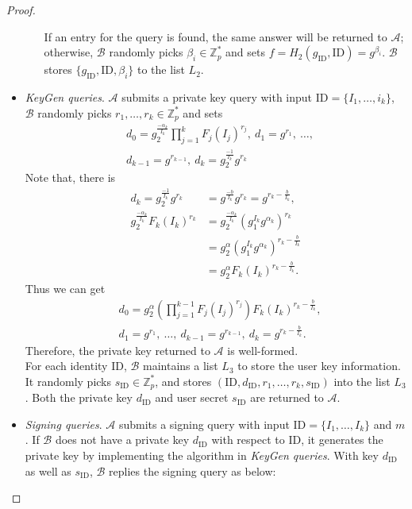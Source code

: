 \documentclass[times]{secauth}
\theoremstyle{definition}
\theoremstyle{remark}
\begin{document}
\begin{proof}
\begin{itemize}
\begin{itemize}
		If an entry for the query is found, the same answer will be returned to $\mathcal{A}$; otherwise, $\mathcal{B}$ randomly picks $\beta_i \in \mathbb{Z}_p^*$ and sets $f = H_2(g_\mathrm{ID}, \mathrm{ID}) = g^{\beta_i}$. 
		$\mathcal{B}$ stores $\{g_\mathrm{ID}, \mathrm{ID}, \beta_i\}$ to the list $L_2$. 	
	\end{itemize}
	\item \emph{KeyGen queries}. 
	$\mathcal{A}$ submits a private key query with input $\mathrm{ID} = \{I_1, \ldots, i_k\}$, $\mathcal{B}$ randomly picks $r_1, \ldots, r_k \in \mathbb{Z}_p^*$ and sets
	\begin{align*}
	&d_0 = g_2^{\frac{-\alpha_k}{I_k}}\prod_{j=1}^{k}F_j(I_j)^{r_j}, ~d_1=g^{r_1}, ~\ldots, \\
	&d_{k-1}=g^{r_{k-1}}, ~d_k=g_2^{\frac{-1}{I_k}}g^{r_k}
	\end{align*}
	Note that, there is 
	\begin{align*}
	d_k = g_2^{\frac{-1}{I_k}}g^{r_k} &= g^{\frac{-b}{I_k}}g^{r_k} = g^{r_k-\frac{b}{I_k}},\\
	g_2^{\frac{-\alpha_k}{I_k}}F_k(I_k)^{r_k} &= g_2^{\frac{-\alpha_k}{I_k}}(g_1^{I_k}g^{\alpha_k})^{r_k} \\
	&= g_2^\alpha(g_1^{I_k}g^{\alpha_k})^{r_k-\frac{b}{I_k}} \\
	&= g_2^\alpha F_k(I_k)^{r_k-\frac{b}{I_k}}.
	\end{align*}
	Thus we can get 
	\begin{align*}
	&d_0 = g_2^\alpha \left(\prod_{j=1}^{k-1}F_j(I_j)^{r_j}\right)F_k(I_k)^{r_k-\frac{b}{I_k}}, \\
	&d_1=g^{r_1}, ~\ldots, ~d_{k-1}=g^{r_{k-1}}, ~d_k=g^{r_k-\frac{b}{I_k}}.
	\end{align*}
	Therefore, the private key returned to $\mathcal{A}$ is well-formed.\\
	For each identity ID, $\mathcal{B}$ maintains a list $L_3$ to store the user key information.
	It randomly picks $s_\mathrm{ID} \in \mathbb{Z}_p^*$, and stores $(\mathrm{ID}, d_\mathrm{ID}, r_1, \ldots, r_k, s_\mathrm{ID})$ into the list $L_3$. 
	Both the private key $d_{\mathrm{ID}}$ and user secret $s_\mathrm{ID}$ are returned to $\mathcal{A}$.
	\item \emph{Signing queries}. 
	$\mathcal{A}$ submits a signing query with input $\mathrm{ID} = \{I_1, \ldots, I_k\}$ and $m$.
	If $\mathcal{B}$ does not have a private key $d_{\mathrm{ID}}$ with respect to ID, it generates the private key by implementing the algorithm in \emph{KeyGen queries}. 
With key $d_\mathrm{ID}$ as well as $s_\mathrm{ID}$, $\mathcal{B}$ replies the signing query as below:

\end{itemize}
\end{proof}
\end{document}
